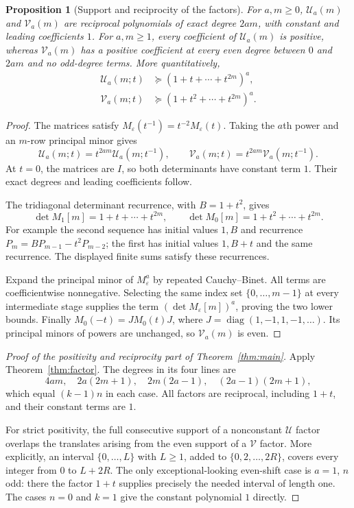 \documentclass[11pt]{article}
\newtheorem{proposition}[theorem]{Proposition}
\theoremstyle{definition}
\theoremstyle{remark}
\newcommand{\diag}{\operatorname{diag}}
\newcommand{\U}{\mathcal U}
\newcommand{\V}{\mathcal V}
\newcommand{\coeffge}{\succeq}
\newcommand{\eps}{\varepsilon}
\numberwithin{equation}{section}
\begin{document}
\begin{proposition}[Support and reciprocity of the factors]
\label{prop:factor-positive}
For $a,m\ge0$, $\U_a(m)$ and $\V_a(m)$ are reciprocal polynomials of
exact degree $2am$, with constant and leading coefficients $1$.
For $a,m\ge1$, every coefficient of $\U_a(m)$ is positive, whereas
$\V_a(m)$ has a positive coefficient at every even degree between $0$ and
$2am$ and no odd-degree terms. More quantitatively,
\begin{align}
 \U_a(m;t)&\coeffge(1+t+\cdots+t^{2m})^a,\label{eq:U-lower}\\
 \V_a(m;t)&\coeffge(1+t^2+\cdots+t^{2m})^a.\label{eq:V-lower}
\end{align}
\end{proposition}
\begin{proof}
The matrices satisfy $M_\eps(t^{-1})=t^{-2}M_\eps(t)$.
Taking the $a$th power and an $m$-row principal minor gives
\[
 \U_a(m;t)=t^{2am}\U_a(m;t^{-1}),\qquad
 \V_a(m;t)=t^{2am}\V_a(m;t^{-1}).
\]
At $t=0$, the matrices are $I$, so both determinants have constant term
$1$. Their exact degrees and leading coefficients follow.

The tridiagonal determinant recurrence, with $B=1+t^2$, gives
\[
 \det M_1[m]=1+t+\cdots+t^{2m},\qquad
 \det M_0[m]=1+t^2+\cdots+t^{2m}.
\]
For example the second sequence has initial values $1,B$ and recurrence
$P_m=BP_{m-1}-t^2P_{m-2}$; the first has initial values $1,B+t$
and the same recurrence. The displayed finite sums satisfy these recurrences.

Expand the principal minor of $M_\eps^a$ by repeated Cauchy--Binet. All
terms are coefficientwise nonnegative. Selecting the same index set
$\{0,\ldots,m-1\}$ at every intermediate stage supplies the term
$(\det M_\eps[m])^a$, proving the two lower bounds.
Finally $M_0(-t)=J M_0(t)J$, where $J=\diag(1,-1,1,-1,\ldots)$.
Its principal minors of powers are unchanged, so $\V_a(m)$ is even.
\end{proof}

\begin{proof}[Proof of the positivity and reciprocity part of Theorem~\ref{thm:main}]
Apply Theorem~\ref{thm:factor}. The degrees in its four lines are
\[
 4am,\quad 2a(2m+1),\quad 2m(2a-1),\quad (2a-1)(2m+1),
\]
which equal $(k-1)n$ in each case. All factors are reciprocal, including
$1+t$, and their constant terms are $1$.

For strict positivity, the full consecutive support of a nonconstant
$\U$ factor overlaps the translates arising from the even support of a
$\V$ factor. More explicitly, an interval $\{0,\ldots,L\}$ with $L\ge1$,
added to $\{0,2,\ldots,2R\}$, covers every integer from $0$ to $L+2R$.
The only exceptional-looking even-shift case is $a=1$, $n$ odd: there the
factor $1+t$ supplies precisely the needed interval of length one.
The cases $n=0$ and $k=1$ give the constant polynomial $1$ directly.
\end{proof}
\end{document}
